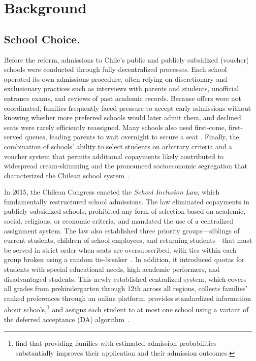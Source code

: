 \documentclass[11pt]{article}
\begin{document}
\section{Background}\label{sec:background}

\subsection{School Choice.}

Before the reform, admissions to Chile's public and publicly subsidized (voucher) schools were conducted through fully decentralized processes. Each school operated its own admissions procedure, often relying on discretionary and exclusionary practices such as interviews with parents and students, unofficial entrance exams, and reviews of past academic records. Because offers were not coordinated, families frequently faced pressure to accept early admissions without knowing whether more preferred schools would later admit them, and declined seats were rarely efficiently reassigned. Many schools also used first-come, first-served queues, leading parents to wait overnight to secure a seat \citep{correa2021}. Finally, the combination of schools' ability to select students on arbitrary criteria and a voucher system that permits additional copayments likely contributed to widespread cream‑skimming and the pronounced socioeconomic segregation that characterized the Chilean school system~\citep{gazmuri2024}. 

In 2015, the Chilean Congress enacted the \emph{School Inclusion Law}, which fundamentally restructured school admissions. The law eliminated copayments in publicly subsidized schools, prohibited any form of selection based on academic, social, religious, or economic criteria, and mandated the use of a centralized assignment system. The law also established three priority groups—siblings of current students, children of school employees, and returning students—that must be served in strict order when seats are oversubscribed, with ties within each group broken using a random tie-breaker~\citep{correa2021}. In addition, it introduced quotas for students with special educational needs, high academic performers, and disadvantaged students.
This newly established centralized system, which covers all grades from prekindergarten through 12th across all regions, collects families' ranked preferences through an online platform, provides standardized information about schools,\footnote{\cite{arteaga2022smart} find that providing families with estimated admission probabilities substantially improves their application and their admission outcomes.} and assigns each student to at most one school using a variant of the deferred acceptance (DA) algorithm~\citep{correa2021}. 
\end{document}

